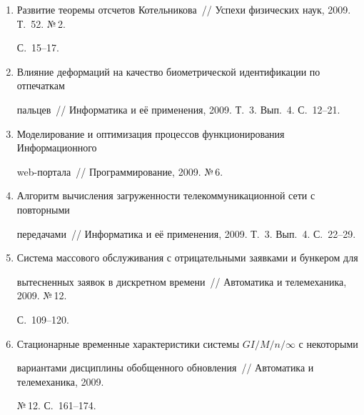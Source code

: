 \begin{enumerate}[1.]
\item {}


Развитие теоремы отсчетов Котельникова~// Успехи физических наук, 2009. Т.~52. №\,2. 


С.~15--17.





\item {}


Влияние деформаций на качество биометрической идентификации по отпечаткам 


пальцев~// Информатика и её применения, 2009. Т.~3. Вып.~4. С.~12--21.





\item {}


Моделирование и оптимизация процессов функционирования Информационного 


web-пор\-та\-ла~// Программирование, 2009. №\,6.





\item {}


Алгоритм вычисления загруженности телекоммуникационной сети с повторными 


передачами~// Информатика и её применения, 2009.  Т.~3.  Вып.~4. С.~22--29.





\item {}


Система массового обслуживания с отрицательными заявками и бункером для 


вытесненных заявок в дискретном времени~// Автоматика и телемеханика, 2009.  №\,12.  


С.~109--120.





\item {}


Стационарные временные характеристики системы $GI/M/n/\infty$ с некоторыми 


вариантами дисциплины обобщенного обновления~// Автоматика и телемеханика, 2009.  


№\,12. С.~161--174.






\end{enumerate}
